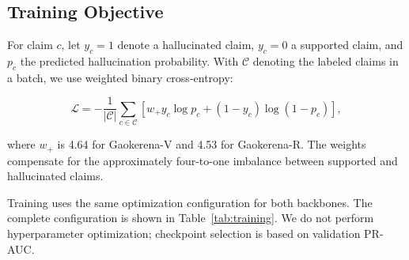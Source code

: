 \documentclass[conference,a4paper]{IEEEtran}
\begin{document}
\subsection{Training Objective}

For claim $c$, let $y_c=1$ denote a hallucinated claim, $y_c=0$ a supported claim, and $p_c$ the predicted hallucination probability. With $\mathcal{C}$ denoting the labeled claims in a batch, we use weighted binary cross-entropy:

\begin{equation}
\mathcal{L} =
-\frac{1}{|\mathcal{C}|}
\sum_{c\in\mathcal{C}}
\left[
 w_{+} y_c \log p_c + (1-y_c)\log(1-p_c)
\right],
\end{equation}

where $w_{+}$ is 4.64 for Gaokerena-V and 4.53 for Gaokerena-R. The weights compensate for the approximately four-to-one imbalance between supported and hallucinated claims.

Training uses the same optimization configuration for both backbones. The complete configuration is shown in Table~\ref{tab:training}. We do not perform hyperparameter optimization; checkpoint selection is based on validation PR-AUC.
\end{document}
